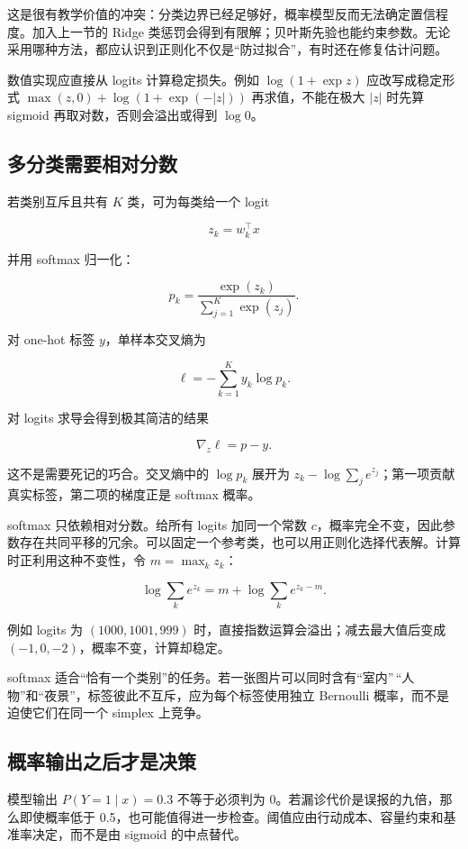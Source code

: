 这是很有教学价值的冲突：分类边界已经足够好，概率模型反而无法确定置信程度。加入上一节的 Ridge 类惩罚会得到有限解；贝叶斯先验也能约束参数。无论采用哪种方法，都应认识到正则化不仅是``防过拟合''，有时还在修复估计问题。

数值实现应直接从 logits 计算稳定损失。例如 \(\log(1+\exp z)\) 应改写成稳定形式 \(\max(z,0)+\log(1+\exp(-|z|))\) 再求值，不能在极大 \(|z|\) 时先算 sigmoid 再取对数，否则会溢出或得到 \(\log 0\)。

\subsection{多分类需要相对分数}

若类别互斥且共有 \(K\) 类，可为每类给一个 logit

\[
z_k=w_k^\top x
\]

并用 softmax 归一化：

\[
p_k=\frac{\exp(z_k)}{\sum_{j=1}^K\exp(z_j)}.
\]

对 one-hot 标签 \(y\)，单样本交叉熵为

\[
\ell=-\sum_{k=1}^Ky_k\log p_k.
\]

对 logits 求导会得到极其简洁的结果

\[
\nabla_z\ell=p-y.
\]

这不是需要死记的巧合。交叉熵中的 \(\log p_k\) 展开为 \(z_k-\log\sum_j e^{z_j}\)；第一项贡献真实标签，第二项的梯度正是 softmax 概率。

softmax 只依赖相对分数。给所有 logits 加同一个常数 \(c\)，概率完全不变，因此参数存在共同平移的冗余。可以固定一个参考类，也可以用正则化选择代表解。计算时正利用这种不变性，令 \(m=\max_k z_k\)：

\[
\log\sum_k e^{z_k}
=m+\log\sum_k e^{z_k-m}.
\]

例如 logits 为 \((1000,1001,999)\) 时，直接指数运算会溢出；减去最大值后变成 \((-1,0,-2)\)，概率不变，计算却稳定。

softmax 适合``恰有一个类别''的任务。若一张图片可以同时含有``室内''\,``人物''和``夜景''，标签彼此不互斥，应为每个标签使用独立 Bernoulli 概率，而不是迫使它们在同一个 simplex 上竞争。

\subsection{概率输出之后才是决策}

模型输出 \(P(Y=1\mid x)=0.3\) 不等于必须判为 0。若漏诊代价是误报的九倍，那么即使概率低于 0.5，也可能值得进一步检查。阈值应由行动成本、容量约束和基准率决定，而不是由 sigmoid 的中点替代。

